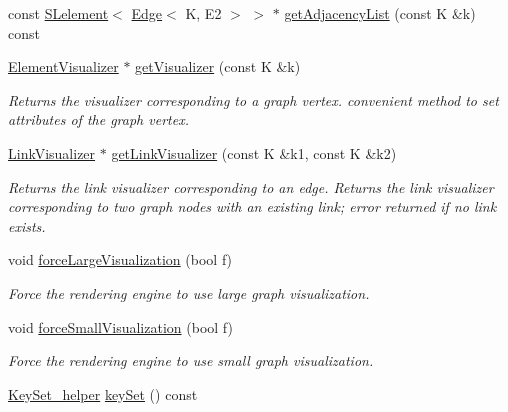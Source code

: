 \begin{DoxyCompactItemize}
const \hyperlink{classbridges_1_1datastructure_1_1_s_lelement}{S\+Lelement}$<$ \hyperlink{classbridges_1_1datastructure_1_1_edge}{Edge}$<$ K, E2 $>$ $>$ $\ast$ \hyperlink{classbridges_1_1datastructure_1_1_graph_adj_list_a1f8ea98a84017aa4bf6058475c0b3ed0}{get\+Adjacency\+List} (const K \&k) const
\item 
\hyperlink{classbridges_1_1datastructure_1_1_element_visualizer}{Element\+Visualizer} $\ast$ \hyperlink{classbridges_1_1datastructure_1_1_graph_adj_list_a097e4678b1273c29b1ac63319b4535e5}{get\+Visualizer} (const K \&k)
\begin{DoxyCompactList}\small\item\em Returns the visualizer corresponding to a graph vertex. convenient method to set attributes of the graph vertex. \end{DoxyCompactList}\item 
\hyperlink{classbridges_1_1datastructure_1_1_link_visualizer}{Link\+Visualizer} $\ast$ \hyperlink{classbridges_1_1datastructure_1_1_graph_adj_list_ae36ba10fae403339df0c36707ed13536}{get\+Link\+Visualizer} (const K \&k1, const K \&k2)
\begin{DoxyCompactList}\small\item\em Returns the link visualizer corresponding to an edge. Returns the link visualizer corresponding to two graph nodes with an existing link; error returned if no link exists. \end{DoxyCompactList}\item 
void \hyperlink{classbridges_1_1datastructure_1_1_graph_adj_list_a6860a0a153fd126ebe8b1bc40d2753a7}{force\+Large\+Visualization} (bool f)
\begin{DoxyCompactList}\small\item\em Force the rendering engine to use large graph visualization. \end{DoxyCompactList}\item 
void \hyperlink{classbridges_1_1datastructure_1_1_graph_adj_list_a9706e3df7d30320b7e7773a6423e4ff7}{force\+Small\+Visualization} (bool f)
\begin{DoxyCompactList}\small\item\em Force the rendering engine to use small graph visualization. \end{DoxyCompactList}\item 
\hyperlink{classbridges_1_1datastructure_1_1_graph_adj_list_1_1_key_set__helper}{Key\+Set\+\_\+helper} \hyperlink{classbridges_1_1datastructure_1_1_graph_adj_list_a0562e8d82499f26ad656a1dfb5f8908e}{key\+Set} () const

\end{DoxyCompactItemize}

